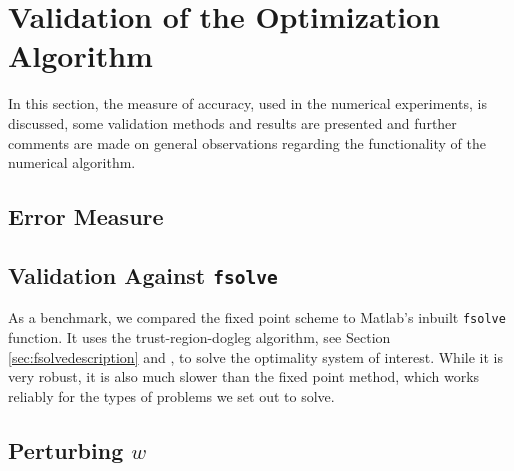 \documentclass[11pt, a4paper]{article}
\theoremstyle{definition}
\begin{document}
	\section{Validation of the Optimization Algorithm} \label{sec:Validation}
	In this section, the measure of accuracy, used in the numerical experiments, is discussed, some validation methods and results are presented and further comments are made on general observations regarding the functionality of the numerical algorithm.
	
	\subsection{Error Measure}\label{sec:ErrorMeasure}
	
	
	
	\subsection{Validation Against \texttt{fsolve}}
	As a benchmark, we compared the fixed point scheme to Matlab's inbuilt \texttt{fsolve} function. It uses the trust-region-dogleg algorithm, see Section \ref{sec:fsolvedescription} and \cite{Powell1}, to solve the optimality system of interest. While it is very robust, it is also much slower than the fixed point method, which works reliably for the types of problems we set out to solve. 
	
	
	
	\subsection{Perturbing $w$}
	
	
\end{document}
